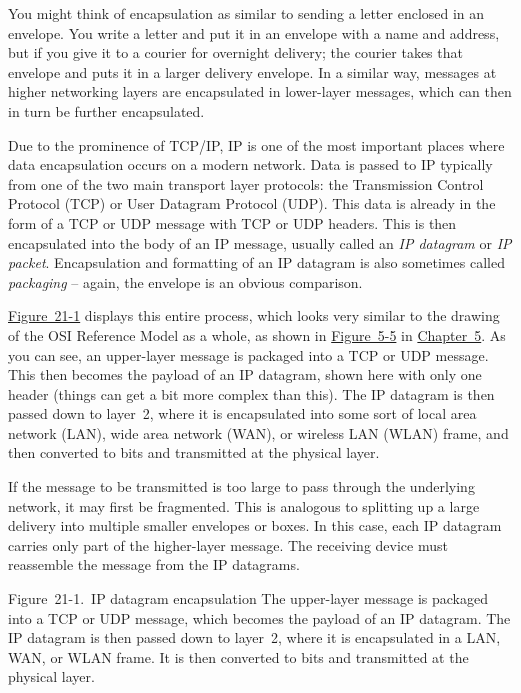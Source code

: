 You might think of encapsulation as similar to sending a letter enclosed
in an envelope.
You write a letter and put it in an envelope with a name and address, but if you give it to a courier for overnight delivery;
the courier takes that envelope and puts it in a larger delivery envelope.
In a similar way, messages at higher networking layers are encapsulated in lower-layer messages, which can then in turn be further encapsulated.

Due to the prominence of TCP/IP, IP is one of the most important places
where data encapsulation occurs on a modern network. Data is passed to
IP typically from one of the two main transport layer protocols: the
Transmission Control Protocol (TCP) or User Datagram Protocol (UDP).
This data is already in the form of a TCP or UDP message with TCP or UDP
headers. This is then encapsulated into the body of an IP message,
usually called an {\emph{IP datagram}} or {\emph{IP packet}}.
Encapsulation and formatting of an IP datagram is also sometimes called
{\emph{packaging}} -- again, the envelope is an obvious comparison.

\protect\hyperlink{ch21.htmlux5cux23ip_datagram_encapsulation_the_upper-laye}{Figure~21-1}
displays this entire process, which looks very similar to the drawing of
the OSI Reference Model as a whole, as shown in
\protect\hyperlink{ch05s03.htmlux5cux23osi_reference_model_data_encapsulation_e}{Figure~5-5}
in \protect\hyperlink{ch05.html}{Chapter~5}. As you can see, an
upper-layer message is packaged into a TCP or UDP message. This then
becomes the payload of an IP datagram, shown here with only one header
(things can get a bit more complex than this). The IP datagram is then
passed down to layer~2, where it is encapsulated into some sort of local
area network (LAN), wide area network (WAN), or wireless LAN (WLAN)
frame, and then converted to bits and transmitted at the physical layer.

If the message to be transmitted is too large to pass through the
underlying network, it may first be fragmented. This is analogous to
splitting up a large delivery into multiple smaller envelopes or boxes.
In this case, each IP datagram carries only part of the higher-layer
message. The receiving device must reassemble the message from the IP
datagrams.





Figure~21-1.~IP datagram encapsulation The upper-layer message is
packaged into a TCP or UDP message, which becomes the payload of an IP
datagram. The IP datagram is then passed down to layer~2, where it is
encapsulated in a LAN, WAN, or WLAN frame. It is then converted to bits
and transmitted at the physical layer.

